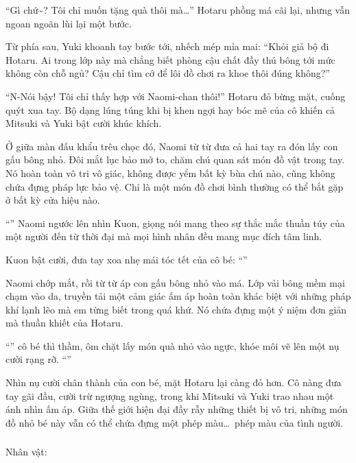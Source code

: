 \documentclass[../main.tex]{subfiles}
\begin{document}
``Gì chứ\~{}? Tôi chỉ muốn tặng quà thôi mà\dots'' Hotaru phồng má cãi lại, nhưng vẫn ngoan ngoãn lùi lại một bước.

Từ phía sau, Yuki khoanh tay bước tới, nhếch mép mỉa mai: ``Khỏi giả bộ đi Hotaru. Ai trong lớp này mà chẳng biết phòng cậu chất đầy thú bông tới mức không còn chỗ ngủ? Cậu chỉ tìm cớ để lôi đồ chơi ra khoe thôi đúng không?''

``N-Nói bậy! Tôi chỉ thấy hợp với Naomi-chan thôi!'' Hotaru đỏ bừng mặt, cuống quýt xua tay. Bộ dạng lúng túng khi bị khen ngợi hay bóc mẽ của cô khiến cả Mitsuki và Yuki bật cười khúc khích.

Ở giữa màn đấu khẩu trêu chọc đó, Naomi từ từ đưa cả hai tay ra đón lấy con gấu bông nhỏ. Đôi mắt lục bảo mở to, chăm chú quan sát món đồ vật trong tay. Nó hoàn toàn vô tri vô giác, không được yểm bất kỳ bùa chú nào, cũng không chứa đựng pháp lực bảo vệ. Chỉ là một món đồ chơi bình thường có thể bắt gặp ở bất kỳ cửa hiệu nào.

``'' Naomi ngước lên nhìn Kuon, giọng nói mang theo sự thắc mắc thuần túy của một người đến từ thời đại mà mọi hình nhân đều mang mục đích tâm linh.

Kuon bật cười, đưa tay xoa nhẹ mái tóc tết của cô bé: ``''

Naomi chớp mắt, rồi từ từ áp con gấu bông nhỏ vào má. Lớp vải bông mềm mại chạm vào da, truyền tải một cảm giác ấm áp hoàn toàn khác biệt với những pháp khí lạnh lẽo mà em từng biết trong quá khứ. Nó chứa đựng một ý niệm đơn giản mà thuần khiết của Hotaru.

``'' cô bé thì thầm, ôm chặt lấy món quà nhỏ vào ngực, khóe môi vẽ lên một nụ cười rạng rỡ. ``''

Nhìn nụ cười chân thành của con bé, mặt Hotaru lại càng đỏ hơn. Cô nàng đưa tay gãi đầu, cười trừ ngượng ngùng, trong khi Mitsuki và Yuki trao nhau một ánh nhìn ấm áp. Giữa thế giới hiện đại đầy rẫy những thiết bị vô tri, những món đồ nhỏ bé này vẫn có thể chứa đựng một phép màu\dots\ phép màu của tình người.

\newpage

\subsubsection*{\label{ep-ER4}}
\begin{center}{\caviar Nhân vật:  }\end{center}
\end{document}
